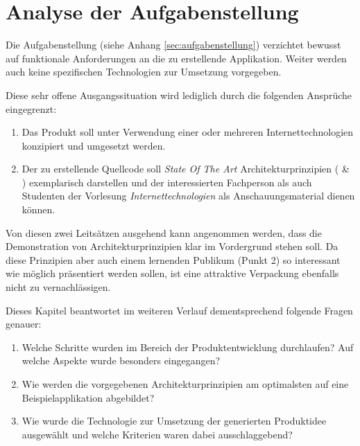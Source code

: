 \chapter{Analyse der Aufgabenstellung}

Die Aufgabenstellung (siehe Anhang \ref{sec:aufgabenstellung}) verzichtet bewusst auf funktionale Anforderungen an die zu erstellende Applikation. Weiter werden auch keine spezifischen Technologien zur Umsetzung vorgegeben.

Diese sehr offene Ausgangssituation wird lediglich durch die folgenden Ansprüche eingegrenzt:

\begin{enumerate}
	\item Das Produkt soll unter Verwendung einer oder mehreren Internettechnologien konzipiert und umgesetzt werden.
	\item Der zu erstellende Quellcode soll \emph{State Of The Art} Architekturprinzipien (\cite{ROCA} \& \cite{TilkovSlides}) exemplarisch darstellen und der interessierten Fachperson als auch Studenten der Vorlesung \emph{Internettechnologien} als Anschauungsmaterial dienen können.
\end{enumerate}

Von diesen zwei Leitsätzen ausgehend kann angenommen werden, dass die Demonstration von Architekturprinzipien klar im Vordergrund stehen soll. Da diese Prinzipien aber auch einem lernenden Publikum (Punkt 2) so interessant wie möglich präsentiert werden sollen, ist eine attraktive Verpackung ebenfalls nicht zu vernachlässigen.

Dieses Kapitel beantwortet im weiteren Verlauf dementsprechend folgende Fragen genauer:

\begin{enumerate}
	\item Welche Schritte wurden im Bereich der Produktentwicklung durchlaufen? Auf welche Aspekte wurde besonders eingegangen?
	\item Wie werden die vorgegebenen Architekturprinzipien am optimalsten auf eine Beispielapplikation abgebildet?
	\item Wie wurde die Technologie zur Umsetzung der generierten Produktidee ausgewählt und welche Kriterien waren dabei ausschlaggebend?
\end{enumerate}

\newpage


\newpage


\newpage


\newpage

